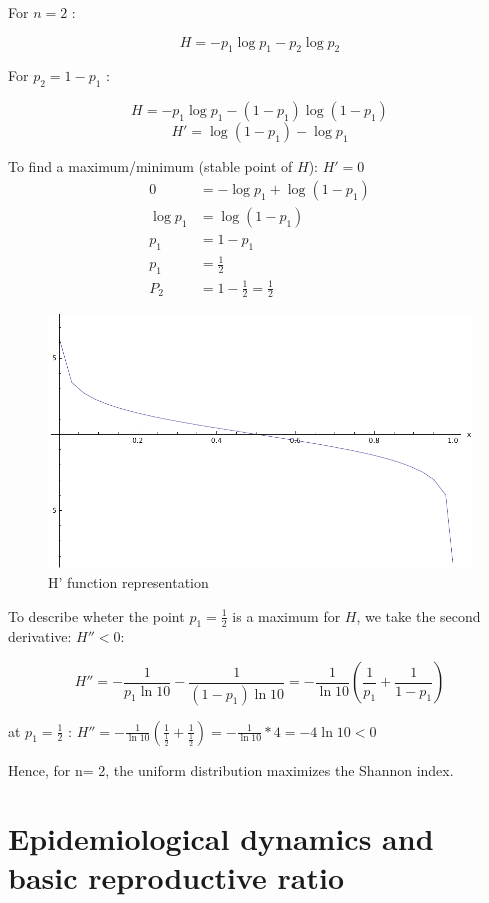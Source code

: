 For $n = 2$ :

\[ H = -p_1\log p_1 - p_2\log p_2 \]

For $p_2 = 1-p_1$ :

\[ H  = -p_1\log p_1 - (1-p_1) \log(1-p_1) \] 
\[H' = \log (1 - p_1) - \log p_1 \]

To find a maximum/minimum (stable point of $H$): $H' = 0$
\begin{align*}
0 &= -\log p_1 + \log (1-p_1)\\
\log p_1 &= \log (1-p_1)\\
p_1 &= 1-p_1\\
p_1 &= \frac{1}{2} \\
P_2 &= 1 - \frac{1}{2} = \frac{1}{2}
\end{align*}

\begin{figure}[htbp]
\centering
\includegraphics[scale=0.6]{./images/graph01}
\caption{H' function representation}
\label{fig:graph01}
\end{figure}

To describe wheter the point $p_1 = \frac{1}{2}$ is a maximum for $H$, we take the second derivative: $H'' < 0$:


\[  H'' = -\frac{1}{p_1\ln 10 } - \frac{1}{(1-p_1)\ln 10} = -\frac{1}{\ln 10} \left(\frac{1}{p_1}+\frac{1}{1-p_1}\right)\]

at $p_1 = \frac{1}{2}$ : $H'' = -\frac{1}{\ln 10} \left(\frac{1}{\frac{1}{2}}+\frac{1}{\frac{1}{2}}\right) = -\frac{1}{\ln 10} * 4 = -4\ln 10 < 0$

Hence, for n= 2, the uniform distribution maximizes the Shannon index.


\setcounter{chapter}{2}
\setcounter{section}{0}
\section{Epidemiological dynamics and basic reproductive ratio}
